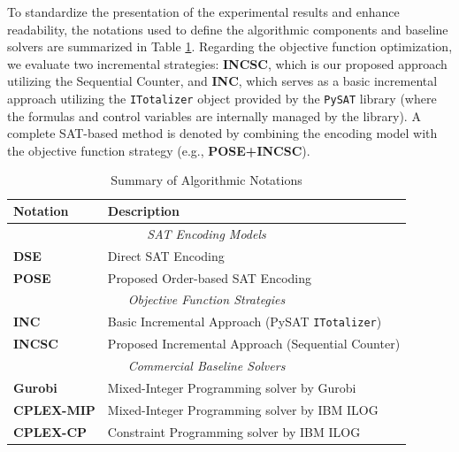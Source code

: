 \documentclass[letterpaper,journal]{IEEEtran}
\begin{document}
To standardize the presentation of the experimental results and enhance readability, the notations used to define the algorithmic components and baseline solvers are summarized in Table \ref{tab:notations}. Regarding the objective function optimization, we evaluate two incremental strategies: \textbf{INCSC}, which is our proposed approach utilizing the Sequential Counter, and \textbf{INC}, which serves as a basic incremental approach utilizing the \texttt{ITotalizer} object provided by the \texttt{PySAT} library (where the formulas and control variables are internally managed by the library). A complete SAT-based method is denoted by combining the encoding model with the objective function strategy (e.g., \textbf{POSE+INCSC}).

\begin{table}[htbp]
\centering
\renewcommand{\arraystretch}{1.2} %
\caption{Summary of Algorithmic Notations}
\label{tab:notations}
\begin{tabular}{l p{}}
\hline
\textbf{Notation} & \textbf{Description} \\
\hline
\multicolumn{2}{c}{\textit{SAT Encoding Models}} \\
\hline
\textbf{DSE} & Direct SAT Encoding \\
\textbf{POSE} & Proposed Order-based SAT Encoding \\
\hline
\multicolumn{2}{c}{\textit{Objective Function Strategies}} \\
\hline
\textbf{INC} & Basic Incremental Approach (PySAT \texttt{ITotalizer}) \\
\textbf{INCSC} & Proposed Incremental Approach (Sequential Counter) \\
\hline
\multicolumn{2}{c}{\textit{Commercial Baseline Solvers}} \\
\hline
\textbf{Gurobi} & Mixed-Integer Programming solver by Gurobi \\
\textbf{CPLEX-MIP} & Mixed-Integer Programming solver by IBM ILOG \\
\textbf{CPLEX-CP} & Constraint Programming solver by IBM ILOG \\
\hline
\end{tabular}
\end{table}
\end{document}

